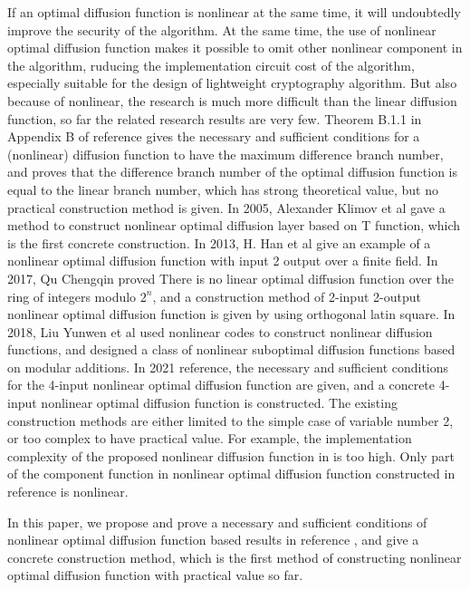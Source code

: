 \documentclass[12pt,a4paper]{article}
\newcommand{\0}{\textbf{0}}
\newcommand{\1}{\textbf{1}}
\begin{document}
    If an optimal diffusion function is nonlinear at the same time, it will undoubtedly improve the security of the algorithm. At the same time, the use of nonlinear optimal diffusion function makes it possible to omit other nonlinear component in the algorithm, ruducing the implementation circuit cost of the algorithm, especially suitable for the design of lightweight cryptography algorithm. But also because of nonlinear, the research is much more difficult than the linear diffusion function, so far the related research results are very few. Theorem B.1.1 in Appendix B of reference\cite{dawu2003advanced} gives the necessary and sufficient conditions for a (nonlinear) diffusion function to have the maximum difference branch number, and proves that the difference branch number of the optimal diffusion function is equal to the linear branch number, which has strong theoretical value, but no practical construction method is given. In 2005, Alexander Klimov et al gave a method to construct nonlinear optimal diffusion layer based on T function\cite{klimov2005new}, which is the first concrete construction. In 2013, H. Han et al give an example of a nonlinear optimal diffusion function with input 2 output over a finite field\cite{han2013properties}. In 2017, Qu Chengqin proved  There is no linear optimal diffusion function over the ring of integers modulo $2^n$\cite{qu2017A}, and a construction method of 2-input 2-output nonlinear optimal diffusion function is given by using orthogonal latin square. In 2018, Liu Yunwen et al used nonlinear codes to construct nonlinear diffusion functions\cite{liu2018nonlinear}, and designed a class of nonlinear suboptimal diffusion functions based on modular additions. In 2021 reference\cite{shamsabad2021family}, the necessary and sufficient conditions for the 4-input nonlinear optimal diffusion function are given, and a concrete 4-input nonlinear optimal diffusion function is constructed. The existing construction methods are either limited to the simple case of variable number 2, or too complex to have practical value. For example, the implementation complexity of the proposed nonlinear diffusion function in \cite{klimov2005new} is too high. Only part of the component function in nonlinear optimal diffusion function constructed in reference\cite{shamsabad2021family} is nonlinear.

    In this paper, we propose and prove a necessary and sufficient conditions of nonlinear optimal diffusion function based results in reference \cite{shamsabad2021family} , and give  a concrete construction method, which is the first method of constructing nonlinear optimal diffusion function with practical value so far.
\end{document}
